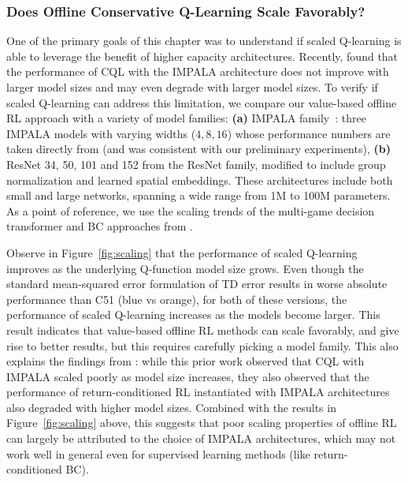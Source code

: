 \subsubsection{Does Offline Conservative Q-Learning Scale Favorably?}
\vspace{-0.2cm}
One of the primary goals of this chapter was to understand if scaled Q-learning is able to leverage the benefit of higher capacity architectures. Recently, \citet{lee2022multi} found that the performance of CQL with the IMPALA architecture does not improve with larger model sizes and may even degrade with larger model sizes. To verify if scaled Q-learning can address this limitation, we compare our value-based offline RL approach with a variety of model families: \textbf{(a)} IMPALA family~\citep{espeholt2018impala}: three IMPALA models with varying widths ($4, 8, 16$) whose performance numbers are taken directly from \citet{lee2022multi} (and was consistent with our preliminary experiments), 
\textbf{(b)} ResNet 34, 50, 101 and 152 from the ResNet family, modified to include group normalization and learned spatial embeddings.%
These architectures include both small and large networks, spanning a wide range from 1M to 100M parameters. As a point of reference, we use the scaling trends of the multi-game decision transformer and BC approaches from \citet{lee2022multi}.

Observe in Figure~\ref{fig:scaling} that the performance of scaled Q-learning improves as the underlying Q-function model size grows. Even though the standard mean-squared error formulation of TD error results in worse absolute performance than C51 (blue vs orange), for both of these versions, the performance of scaled Q-learning increases as the models become larger. This result indicates that value-based offline RL methods can scale favorably, and give rise to better results, but this requires carefully picking a model family. This also explains the findings from \citet{lee2022multi}: while this prior work observed that CQL with IMPALA scaled poorly as model size increases, they also observed that the performance of return-conditioned RL instantiated with IMPALA architectures also degraded with higher model sizes. Combined with the results in Figure~\ref{fig:scaling} above, this suggests that poor scaling properties of offline RL can largely be attributed to the choice of IMPALA architectures, which may not work well in general even for supervised learning methods (like return-conditioned BC).


